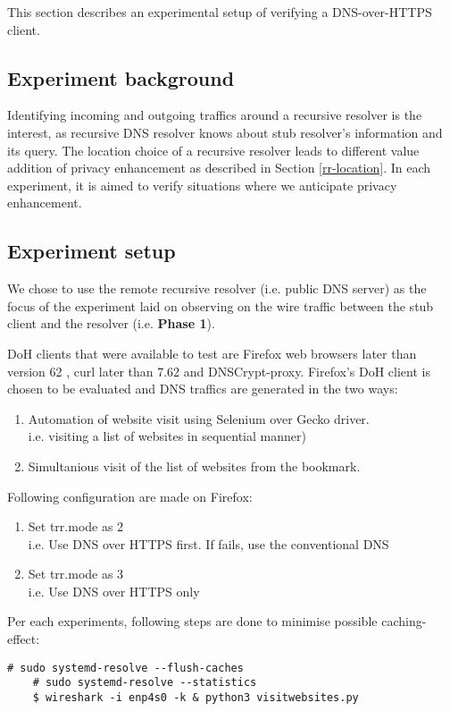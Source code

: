 This section describes an experimental setup of verifying a DNS-over-HTTPS client.

\subsection{Experiment background}
Identifying incoming and outgoing traffics around a recursive resolver is the interest, as recursive DNS resolver knows about stub resolver's information and its query.
The location choice of a recursive resolver leads to different value addition of privacy enhancement as described in Section \ref{rr-location}. In each experiment, it is aimed to verify situations where we anticipate privacy enhancement.

\subsection{Experiment setup}\label{simulation}
We chose to use the remote recursive resolver (i.e. public DNS server) as the focus of the experiment laid on observing on the wire traffic between the stub client and the resolver (i.e. \textbf{Phase 1}).

DoH clients that were available to test are Firefox web browsers later than version 62 \cite{FirefoxDoH}, curl later than 7.62 \cite{CurlDoH} and DNSCrypt-proxy.
Firefox's DoH client is chosen to be evaluated and DNS traffics are generated in the two ways:
\begin{enumerate}
    \item Automation of website visit using Selenium over Gecko driver.
    \\i.e. visiting a list of websites in sequential manner)
    \item Simultanious visit of the list of websites from the bookmark.
\end{enumerate}
Following configuration are made on Firefox:
\begin{enumerate}
    \item Set trr.mode as 2
    \\i.e. Use DNS over HTTPS first. If fails, use the conventional DNS
    \item Set trr.mode as 3
    \\i.e. Use DNS over HTTPS only
\end{enumerate}
Per each experiments, following steps are done to minimise possible caching-effect:
\begin{lstlisting}[basicstyle=\ttfamily]
    # sudo systemd-resolve --flush-caches
    # sudo systemd-resolve --statistics
    $ wireshark -i enp4s0 -k & python3 visitwebsites.py
\end{lstlisting}
